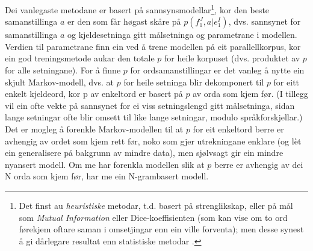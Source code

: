 \documentclass[12pt,a4paper,oneside,draft]{report}
\begin{document}
Dei vanlegaste metodane er basert på sannsynsmodellar\footnote{Det finst au \emph{heuristiske} metodar, t.d. basert på
        strenglikskap, eller på mål som \emph{Mutual Information} eller
        Dice-koeffisienten (som kan vise om to ord førekjem oftare
        saman i omsetjingar enn ein ville forventa); men desse synest
        å gi dårlegare resultat enn statistiske metodar
        \citep{och2003scv}. }, kor den
 beste samanstillinga $a$ er den som får høgast skåre på
 $p(f_1^J,a|e_1^I)$, dvs. sannsynet for samanstillinga $a$ og
 kjeldesetninga gitt målsetninga og parametrane i modellen. Verdien
 til parametrane finn ein ved å trene modellen på eit parallellkorpus,
 kor ein god treningsmetode aukar den totale $p$ for heile korpuset
 (dvs. produktet av $p$ for alle setningane).  For å finne $p$ for
 ordsamanstillingar er det vanleg å nytte ein skjult Markov-modell,
 dvs. at $p$ for heile setninga blir dekomponert til $p$ for eitt
 enkelt kjeldeord, kor p av enkeltord er basert på $p$ av orda som
 kjem før. (I tillegg vil ein ofte vekte på sannsynet for ei viss
 setningslengd gitt målsetninga, sidan lange setningar ofte blir
 omsett til like lange setningar, modulo språkforskjellar.) Det er
 mogleg å forenkle Markov-modellen til at $p$ for eit enkeltord berre
 er avhengig av ordet som kjem rett før, noko som gjer utrekningane
 enklare (og lèt ein generalisere på bakgrunn av mindre data), men
 sjølvsagt gir ein mindre nyansert modell. Om me har forenkla modellen
 slik at $p$ berre er avhengig av dei N orda som kjem før, har me ein
 N-grambasert modell.
 
\end{document}
